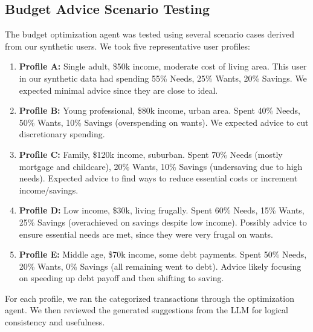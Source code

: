 \documentclass{scrartcl}
\begin{document}
\subsection{Budget Advice Scenario Testing}
The budget optimization agent was tested using several scenario cases derived from our synthetic users. We took five representative user profiles:
\begin{enumerate}
    \item \textbf{Profile A:} Single adult, \$50k income, moderate cost of living area. This user in our synthetic data had spending 55\% Needs, 25\% Wants, 20\% Savings. We expected minimal advice since they are close to ideal.
    \item \textbf{Profile B:} Young professional, \$80k income, urban area. Spent 40\% Needs, 50\% Wants, 10\% Savings (overspending on wants). We expected advice to cut discretionary spending.
    \item \textbf{Profile C:} Family, \$120k income, suburban. Spent 70\% Needs (mostly mortgage and childcare), 20\% Wants, 10\% Savings (undersaving due to high needs). Expected advice to find ways to reduce essential costs or increment income/savings.
    \item \textbf{Profile D:} Low income, \$30k, living frugally. Spent 60\% Needs, 15\% Wants, 25\% Savings (overachieved on savings despite low income). Possibly advice to ensure essential needs are met, since they were very frugal on wants.
    \item \textbf{Profile E:} Middle age, \$70k income, some debt payments. Spent 50\% Needs, 20\% Wants, 0\% Savings (all remaining went to debt). Advice likely focusing on speeding up debt payoff and then shifting to saving.
\end{enumerate}

For each profile, we ran the categorized transactions through the optimization agent. We then reviewed the generated suggestions from the LLM for logical consistency and usefulness.
\end{document}

